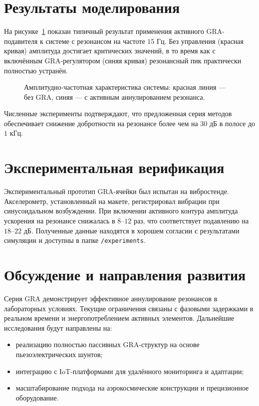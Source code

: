\documentclass[a4paper,12pt]{article}
\begin{document}
\section{Результаты моделирования}
На рисунке~\ref{fig:resonance} показан типичный результат применения активного GRA-подавителя к системе с резонансом на частоте $15$ Гц. Без управления (красная кривая) амплитуда достигает критических значений, в то время как с включённым GRA-регулятором (синяя кривая) резонансный пик практически полностью устранён.

\begin{figure}[h]
\centering
\caption{Амплитудно-частотная характеристика системы: красная линия — без GRA, синяя — с активным аннулированием резонанса.}
\label{fig:resonance}
\end{figure}

Численные эксперименты подтверждают, что предложенная серия методов обеспечивает снижение добротности на резонансе более чем на $30$ дБ в полосе до $1$ кГц.

\section{Экспериментальная верификация}
Экспериментальный прототип GRA-ячейки был испытан на вибростенде. Акселерометр, установленный на макете, регистрировал вибрации при синусоидальном возбуждении. При включении активного контура амплитуда ускорения на резонансе снижалась в $8$–$12$ раз, что соответствует подавлению на $18$–$22$ дБ. Полученные данные находятся в хорошем согласии с результатами симуляции и доступны в папке \texttt{/experiments}.

\section{Обсуждение и направления развития}
Серия GRA демонстрирует эффективное аннулирование резонансов в лабораторных условиях. Текущие ограничения связаны с фазовыми задержками в реальном времени и энергопотреблением активных элементов. Дальнейшие исследования будут направлены на:
\begin{itemize}
    \item реализацию полностью пассивных GRA-структур на основе пьезоэлектрических шунтов;
    \item интеграцию с IoT-платформами для удалённого мониторинга и адаптации;
    \item масштабирование подхода на аэрокосмические конструкции и прецизионное оборудование.
\end{itemize}
\end{document}
